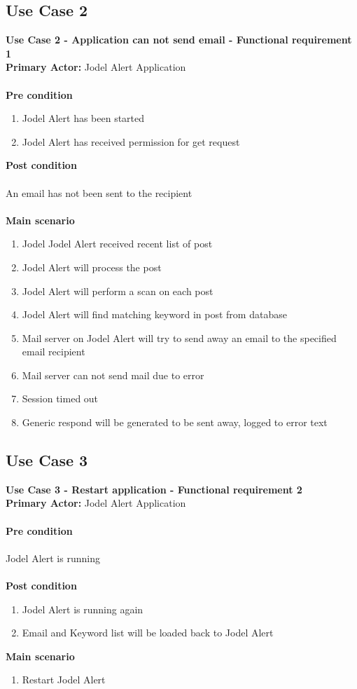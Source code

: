 \documentclass[a4paper,12pt]{article}
\begin{document}
\subsection{Use Case 2}
\textbf{Use Case 2 - Application can not send email - Functional requirement 1}\\
\textbf{Primary Actor:}
Jodel Alert Application\\\\
\textbf{Pre condition}
\begin{enumerate}
	\item Jodel Alert has been started
	\item Jodel Alert has received permission for get request
\end{enumerate}
\textbf{Post condition}\\\\
An email has not been sent to the recipient\\\\
\textbf{Main scenario}
\begin{enumerate}
	\item Jodel Jodel Alert received recent list of post
	\item Jodel Alert will process the post
	\item Jodel Alert will perform a scan on each post
	\item Jodel Alert will find matching keyword in post from database 
	\item Mail server on Jodel Alert will try to send away an email to the specified email recipient
	\item Mail server can not send mail due to error
	\item Session timed out
	\item Generic respond will be generated to be sent away, logged to error text
\end{enumerate}
\subsection{Use Case 3}
\textbf{Use Case 3 - Restart application - Functional requirement 2}\\
\textbf{Primary Actor:}
Jodel Alert Application\\\\
\textbf{Pre condition}\\\\
Jodel Alert is running\\\\
\textbf{Post condition}
\begin{enumerate}
	\item Jodel Alert is running again
	\item Email and Keyword list will be loaded back to Jodel Alert
\end{enumerate}
\textbf{Main scenario}
\begin{enumerate}
	\item Restart Jodel Alert
\end{enumerate}
\end{document}

